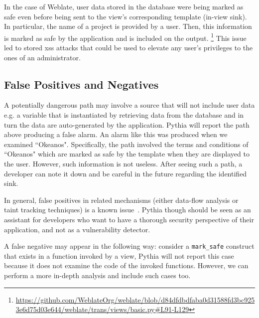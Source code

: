 In the case of Weblate,
user data stored in the database
were being marked as safe
even before being sent to the view's corresponding template (in-view sink).
In particular,
the name of a project is provided by a user.
Then,
this information is marked as safe by
the application and is included on
the output. {\footnote{\url{https://github.com/WeblateOrg/weblate/blob/d84dfdbdfaba0d31588fd3bc9253e6d75d03e644/weblate/trans/views/basic.py\#L91-L129}}}
This issue led to stored {\sc xss} attacks
that could be used to elevate any user's privileges to the ones of an administrator.

\subsection{False Positives and Negatives}
\label{sc:fa}

A potentially dangerous path
may involve a source that will
not include user data
e.g. a variable that is instantiated
by retrieving data from the database
and in turn the data are auto-generated
by the application.
Pythia will report the path above
producing a false alarm.
An alarm like this was produced
when we examined ``Okeanos".
Specifically,
the path involved the terms and
conditions of ``Okeanos"
which are marked as safe by
the template when they are
displayed to the user.
However,
such information is not useless.
After seeing such a path,
a developer can note it down and
be careful in the future regarding the
identified sink.

In general,
false positives in related mechanisms
(either data-flow analysis or
taint tracking techniques)
is a known issue~\cite{ME07, MLPK17}.
Pythia though should be seen
as an assistant for developers
who want to have a thorough
security perspective
of their application,
and not as a vulnerability detector.

A false negative may appear in the following
way: consider a {\tt mark\_safe} construct
that exists in a function invoked by a view,
Pythia will not report this case because
it does not examine the code of the invoked functions.
However, we can perform a more in-depth analysis and
include such cases too.
